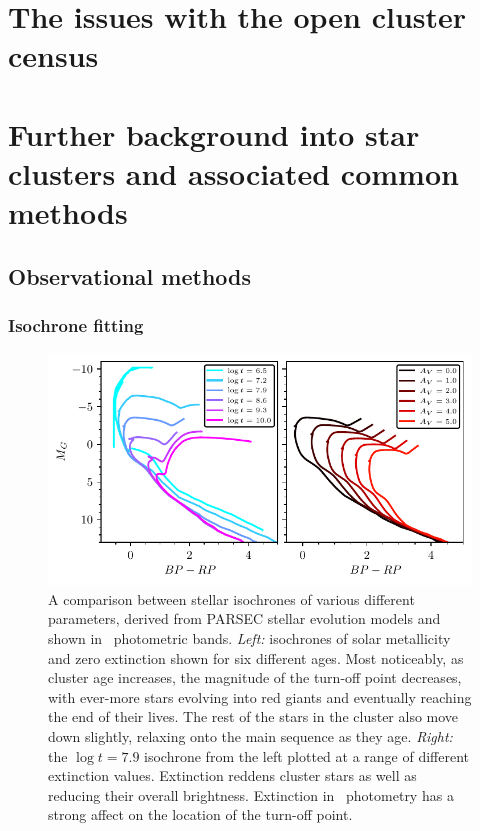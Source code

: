 \section{The issues with the open cluster census}





\section{Further background into star clusters and associated common methods}
\label{sec:intro:theory}

\subsection{Observational methods}
\label{sec:intro:theory:observations}

\subsubsection{Isochrone fitting}

\begin{figure}[tb]
	\includegraphics[width=\textwidth]{fig/c1/isochrones.pdf}
	\caption[A comparison between stellar isochrones of various different parameters.]{A comparison between stellar isochrones of various different parameters, derived from PARSEC stellar evolution models \citep{bressan_parsec_2012} and shown in \gaia\ photometric bands. \emph{Left:} isochrones of solar metallicity and zero extinction shown for six different ages. Most noticeably, as cluster age increases, the magnitude of the turn-off point decreases, with ever-more stars evolving into red giants and eventually reaching the end of their lives. The rest of the stars in the cluster also move down slightly, relaxing onto the main sequence as they age. \emph{Right:} the $\log t = 7.9$ isochrone from the left plotted at a range of different extinction values. Extinction reddens cluster stars as well as reducing their overall brightness. Extinction in \gaia\ photometry has a strong affect on the location of the turn-off point.}
	\label{fig:intro:history:isochrones}
\end{figure}

